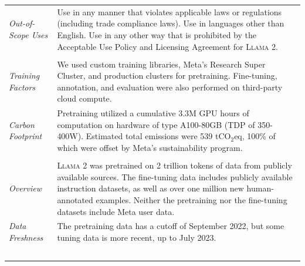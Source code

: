 \documentclass{article}
\newcommand{\cinnamon}{\textsc{Llama 2}\xspace}
\begin{document}
\begin{table}[htbp]
{\begin{tabular}{ p{2.8cm}|p{12.2cm}  }
 \hline
 \textit{Out-of-Scope Uses} & Use in any manner that violates applicable laws or regulations (including trade compliance laws). Use in languages other than English. Use in any other way that is prohibited by the Acceptable Use Policy and Licensing Agreement for \cinnamon. \\
  \Xhline{1.5pt}
  \multicolumn{2}{ c }{\textbf{Hardware and Software} (Section~\ref{sec:training_details})} \\
\Xhline{1.5pt}
\textit{Training Factors} &
   We used custom training libraries, Meta's Research Super Cluster, and production clusters for pretraining. Fine-tuning, annotation, and evaluation were also performed on third-party cloud compute.\\
  \hline
\textit{Carbon Footprint} &  Pretraining utilized a cumulative 3.3M GPU hours of computation on hardware of type A100-80GB (TDP of 350-400W). Estimated total emissions were 539 tCO$_{2}$eq, 100\% of which were offset by Meta’s sustainability program.\\
 \Xhline{1.5pt}
  \multicolumn{2}{ c }{\textbf{Training Data} (Sections~\ref{sec:pretraining_data} and~\ref{sec:fine_tuning}) } \\
\Xhline{1.5pt}
 \textit{Overview} & \cinnamon was pretrained on 2 trillion tokens of data from publicly available sources. The fine-tuning data includes publicly available instruction datasets, as well as over one million new human-annotated examples. Neither the pretraining nor the fine-tuning datasets include Meta user data. \\
 \hline
 \textit{Data Freshness} & The pretraining data has a cutoff of September 2022, but some tuning data is more recent, up to July 2023. \\
 \Xhline{1.5pt}
 \multicolumn{2}{ c }{\textbf{Evaluation Results}} \\
  \Xhline{1.5pt}
  \multicolumn{2}{ p{15cm} }{
  See evaluations for pretraining (Section~\ref{sec:pretraining}); fine-tuning (Section~\ref{sec:fine_tuning}); and safety (Section~\ref{sec:safety_section}).
 } \\
 \Xhline{1.5pt}
\multicolumn{2}{ c }{\textbf{Ethical Considerations and 
Limitations} (Section~\ref{sec:limitations})} \\

 \Xhline{1.5pt}

\multicolumn{2}{p{15cm}}{\cinnamon is a new technology that carries risks with use. Testing conducted to date has been in English, and has not covered, nor could it cover all scenarios. For these reasons, as with all LLMs, \cinnamon's potential outputs cannot be predicted in advance, and the model may in some instances produce inaccurate or objectionable responses to user prompts. Therefore, before deploying any applications of \cinnamon, developers should perform safety testing and tuning tailored to their specific applications of the model. 
Please see the Responsible Use Guide available available at \url{https://ai.meta.com/llama/responsible-user-guide}}
\\
 \Xhline{1.5pt}
 

\end{tabular}}
\end{table}
\end{document}
